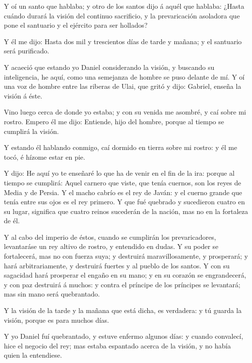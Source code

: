  Y oí un santo que hablaba; y otro de los santos dijo á
aquél que hablaba: ¿Hasta cuándo durará la visión del continuo
sacrificio, y la prevaricación asoladora que pone el santuario y el
ejército para ser hollados?

 Y él me dijo: Hasta dos mil y trescientos días de tarde y
mañana; y el santuario será purificado.

 Y acaeció que estando yo Daniel considerando la visión, y
buscando su inteligencia, he aquí, como una semejanza de hombre se puso
delante de mí.  Y oí una voz de hombre entre las riberas de
Ulai, que gritó y dijo: Gabriel, enseña la visión á éste.

 Vino luego cerca de donde yo estaba; y con su venida me
asombré, y caí sobre mi rostro. Empero él me dijo: Entiende, hijo del
hombre, porque al tiempo se cumplirá la visión.

 Y estando él hablando conmigo, caí dormido en tierra sobre
mi rostro: y él me tocó, é hízome estar en pie.

 Y dijo: He aquí yo te enseñaré lo que ha de venir en el
fin de la ira: porque al tiempo se cumplirá:  Aquel carnero
que viste, que tenía cuernos, son los reyes de Media y de Persia.
 Y el macho cabrío es el rey de Javán: y el cuerno grande
que tenía entre sus ojos es el rey primero.  Y que fué
quebrado y sucedieron cuatro en su lugar, significa que cuatro reinos
sucederán de la nación, mas no en la fortaleza de él.

 Y al cabo del imperio de éstos, cuando se cumplirán los
prevaricadores, levantaráse un rey altivo de rostro, y entendido en
dudas.  Y su poder se fortalecerá, mas no con fuerza suya;
y destruirá maravillosamente, y prosperará; y hará arbitrariamente, y
destruirá fuertes y al pueblo de los santos.  Y con su
sagacidad hará prosperar el engaño en su mano; y en su corazón se
engrandecerá, y con paz destruirá á muchos: y contra el príncipe de los
príncipes se levantará; mas sin mano será quebrantado.

 Y la visión de la tarde y la mañana que está dicha, es
verdadera: y tú guarda la visión, porque es para muchos días.

 Y yo Daniel fuí quebrantado, y estuve enfermo algunos
días: y cuando convalecí, hice el negocio del rey; mas estaba espantado
acerca de la visión, y no había quien la entendiese.

